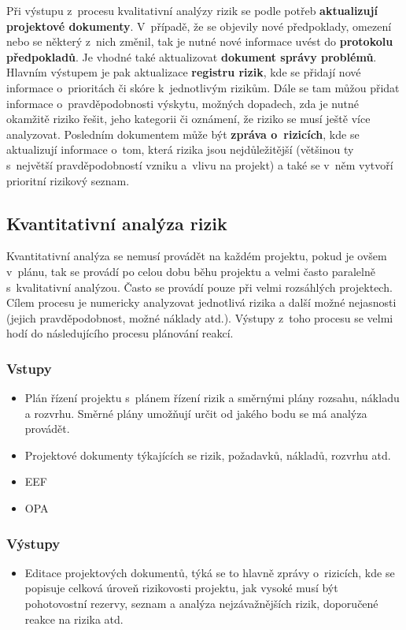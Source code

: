 Při výstupu z~procesu kvalitativní analýzy rizik se podle potřeb \textbf{aktualizují projektové dokumenty}. V~případě, že se objevily nové předpoklady, omezení nebo se některý z~nich změnil, tak je nutné nové informace uvést do \textbf{protokolu předpokladů}. Je vhodné také aktualizovat \textbf{dokument správy problémů}. Hlavním výstupem je pak aktualizace \textbf{registru rizik}, kde se přidají nové informace o~prioritách či skóre k~jednotlivým rizikům. Dále se tam můžou přidat informace o~pravděpodobnosti výskytu, možných dopadech, zda je nutné okamžitě riziko řešit, jeho kategorii či oznámení, že riziko se musí ještě více analyzovat. Posledním dokumentem může být \textbf{zpráva o~rizicích}, kde se aktualizují informace o~tom, která rizika jsou nejdůležitější (většinou ty s~největší pravděpodobností vzniku a~vlivu na projekt) a také se v~něm vytvoří prioritní rizikový seznam.


\subsection*{Kvantitativní analýza rizik}

Kvantitativní analýza se nemusí provádět na každém projektu, pokud je ovšem v~plánu, tak se provádí po celou dobu běhu projektu a velmi často paralelně s~kvalitativní analýzou.  Často se provádí pouze při velmi rozsáhlých projektech. Cílem procesu je numericky analyzovat jednotlivá rizika a další možné nejasnosti (jejich pravděpodobnost, možné náklady atd.). Výstupy z~toho procesu se velmi hodí do následujícího procesu plánování reakcí.

\subsubsection*{Vstupy}
\begin{itemize}
    \item Plán řízení projektu s~plánem řízení rizik a směrnými plány rozsahu, nákladu a rozvrhu. Směrné plány umožňují určit od jakého bodu se má analýza provádět.
    \item Projektové dokumenty týkajících se rizik, požadavků, nákladů, rozvrhu atd.
    \item EEF
    \item OPA
\end{itemize}
\subsubsection*{Výstupy}
\begin{itemize}
    \item Editace projektových dokumentů, týká se to hlavně zprávy o~rizicích, kde se popisuje celková úroveň rizikovosti projektu, jak vysoké musí být pohotovostní rezervy, seznam a analýza nejzávažnějších rizik, doporučené reakce na rizika atd.
\end{itemize}


